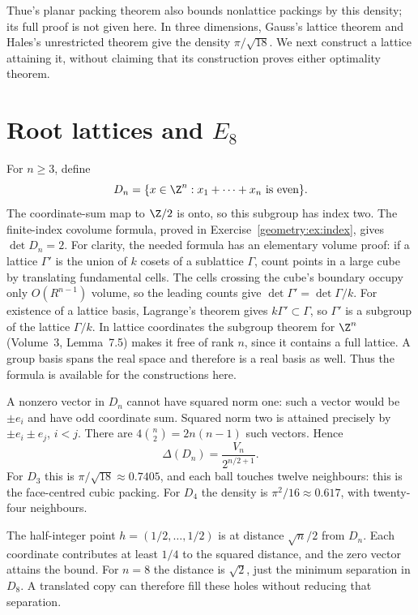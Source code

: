 \begin{remark}
Thue's planar packing theorem also bounds nonlattice packings by this
density; its full proof is not given here. In three dimensions,
Gauss's lattice theorem and Hales's unrestricted theorem give the density
$\pi/\sqrt{18}$. We next construct a lattice attaining it, without
claiming that its construction proves either optimality theorem.
\end{remark}

\section{Root lattices and \texorpdfstring{$E_8$}{E8}}

For $n\ge3$, define
\[
 D_n=\{x\in\Z^n:x_1+\cdots+x_n\text{ is even}\}.
\]
The coordinate-sum map to $\Z/2$ is onto, so this subgroup has index two.
The finite-index covolume formula, proved in
Exercise~\ref{geometry:ex:index}, gives $\det D_n=2$.
For clarity, the needed formula has an elementary volume proof:
if a lattice $\Gamma'$ is the union of $k$ cosets of a sublattice
$\Gamma$, count points in a large cube by translating fundamental cells.
The cells crossing the cube's boundary occupy only $O(R^{n-1})$ volume,
so the leading counts give $\det\Gamma'=\det\Gamma/k$.
For existence of a lattice basis, Lagrange's theorem gives
$k\Gamma'\subset\Gamma$, so $\Gamma'$ is a subgroup of the lattice
$\Gamma/k$. In lattice coordinates the subgroup theorem for $\Z^n$
(Volume~3, Lemma~7.5) makes it free of rank $n$, since it contains a
full lattice. A group basis spans the real space and therefore is a real
basis as well. Thus the formula is available for the constructions here.

A nonzero vector in $D_n$ cannot have squared norm one: such a vector
would be $\pm e_i$ and have odd coordinate sum.
Squared norm two is attained precisely by $\pm e_i\pm e_j$, $i<j$.
There are $4\binom n2=2n(n-1)$ such vectors. Hence
\[
 \Delta(D_n)=\frac{V_n}{2^{n/2+1}}.
\]
For $D_3$ this is $\pi/\sqrt{18}\approx0.7405$, and each ball touches
twelve neighbours: this is the face-centred cubic packing.
For $D_4$ the density is $\pi^2/16\approx0.617$, with twenty-four
neighbours.

The half-integer point $h=(1/2,\ldots,1/2)$ is at distance
$\sqrt n/2$ from $D_n$. Each coordinate contributes at least $1/4$
to the squared distance, and the zero vector attains the bound.
For $n=8$ the distance is $\sqrt2$, just the minimum separation in
$D_8$. A translated copy can therefore fill these holes without reducing
that separation.

